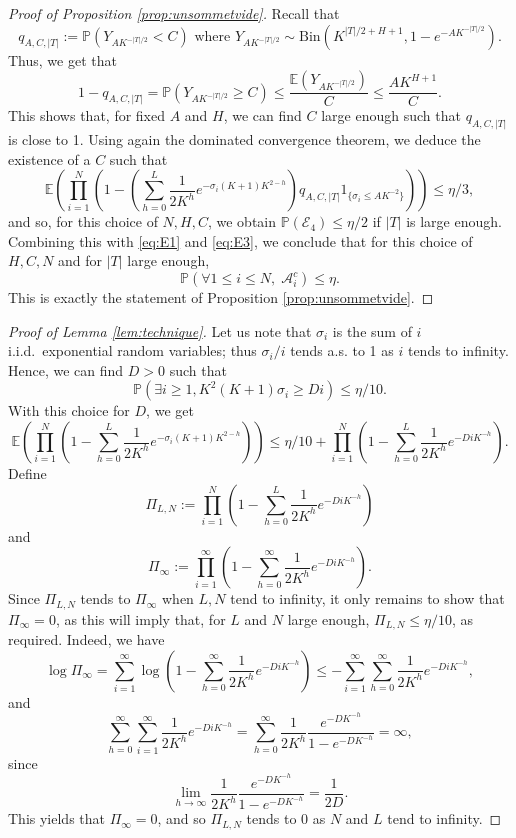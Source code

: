 \documentclass[french]{article}
\newcommand{\E}{\mathbb{E}}
\renewcommand{\P}{\mathbb{P}}
\newcommand{\Tf}{T}
\renewcommand{\1}{\mathds{1}}
\begin{document}
\begin{proof}[Proof of Proposition \ref{prop:unsommetvide}]
Recall that 
$$q_{A,C,|\Tf|}:=\P(Y_{A K^{-|\Tf|/2}}<C) \mbox{ where } Y_{A K^{-|\Tf|/2}}\sim \mbox{Bin}(K^{|\Tf|/2+H+1}, 1-e^{-A K^{-|\Tf|/2}}).$$
Thus, we get that
$$1-q_{A,C,|\Tf|}=\P(Y_{A K^{-|\Tf|/2}}\ge C)\le \frac{\E(Y_{A K^{-|\Tf|/2}})}{C}\le \frac{A K^{H+1}}{C}.$$
This shows that, for fixed $A$ and $H$, we can find $C$ large enough such that $q_{A,C,|\Tf|}$ is close to 1. Using again the dominated convergence theorem, we deduce the existence of a $C$ such that 
$$\E\left(\prod_{i=1}^N \left(1-\left(\sum_{h=0}^L\frac{1}{2K^h}e^{-\sigma_i(K+1)K^{2-h}}\right) q_{A,C,|\Tf|}1_{\{\sigma_i\le A K^{-2}\}}
\right)\right)\le \eta/3,$$
and so, for this choice of $N,H,C$, we obtain $\P(\mathcal{E}_4)\le \eta/2$ if $|\Tf|$ is large enough. Combining this with \eqref{eq:E1} and \eqref{eq:E3}, we conclude that for this choice of $H,C,N$ and for $|\Tf|$ large enough,
\begin{equation*}
 \P(\forall 1\le i\le N,\; \mathcal{A}_i^c)\le \eta.
\end{equation*}
This is exactly the statement of Proposition \ref{prop:unsommetvide}.
\end{proof}

\begin{proof}[Proof of Lemma \ref{lem:technique}]
Let us note that $\sigma_i$ is the sum of $i$ i.i.d.\ exponential random variables; thus $\sigma_i/i$ tends a.s. to 1 as $i$ tends to infinity. Hence, we can find $D>0$ such that 
$$\P(\exists i\ge 1, K^2(K+1)\sigma_i\ge D i)\le \eta/10.$$
With this choice for $D$, we get 
$$ \E\left(\prod_{i=1}^N \left(1-\sum_{h=0}^L\frac{1}{2K^h}e^{-\sigma_i(K+1)K^{2-h}}\right) \right)\le \eta/10+ \prod_{i=1}^N \left(1-\sum_{h=0}^L\frac{1}{2K^h}e^{-DiK^{-h}}\right).$$
Define
\begin{equation*}
       \Pi_{L,N}:= \prod_{i=1}^N \left(1-\sum_{h=0}^L\frac{1}{2K^h}e^{-DiK^{-h}}\right)
    \end{equation*}
and 
\begin{equation*}
      \Pi_{\infty}:= \prod_{i=1}^\infty \left(1-\sum_{h=0}^\infty\frac{1}{2K^h}e^{-DiK^{-h}}\right).
\end{equation*}
Since $\Pi_{L,N}$ tends to $\Pi_\infty$ when $L,N$ tend to infinity, it only remains to show that $\Pi_{\infty}=0$, as this will imply that, for $L$ and $N$ large enough, $\Pi_{L,N}\le \eta/10$, as required. Indeed, we have
$$\log \Pi_\infty = \sum_{i=1}^\infty \log \left(1-\sum_{h=0}^\infty\frac{1}{2K^h}e^{-DiK^{-h}}\right)\le -\sum_{i=1}^\infty \sum_{h=0}^\infty\frac{1}{2K^h} e^{-DiK^{-h}},$$
and    
$$\sum_{h=0}^\infty \sum_{i=1}^\infty\frac{1}{2K^h}e^{-DiK^{-h}}=\sum_{h=0}^\infty \frac{1}{2K^h}\frac{e^{-DK^{-h}}}{1-e^{-DK^{-h}}}=\infty,$$
since $$\lim_{h\to \infty } \frac{1}{2K^h}\frac{e^{-DK^{-h}}}{1-e^{-DK^{-h}}}=\frac{1}{2D}.$$
This yields that $\Pi_\infty=0$, and so $\Pi_{L,N}$ tends to 0 as $N$ and $L$ tend to infinity.
\end{proof}
\end{document}
